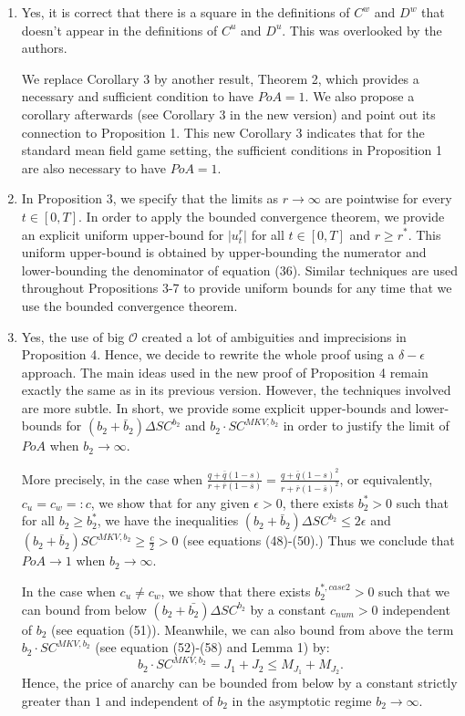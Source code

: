 \documentclass[11pt]{article}
\begin{document}
\begin{enumerate}
	\item Yes, it is correct that there is a square in the definitions of $C^w$ and $D^w$ that doesn't appear in the definitions of $C^u$ and $D^u$. This was overlooked by the authors.
	
	We replace Corollary 3 by another result, Theorem 2, which provides a necessary and sufficient condition to have $PoA = 1$. We also propose a corollary afterwards (see Corollary 3 in the new version) and point out its connection to Proposition 1. This new Corollary 3 indicates that for the standard mean field game setting, the sufficient conditions in Proposition 1 are also necessary to have $PoA=1$.
		
	
	\item In Proposition 3, we specify that the limits as $r \to \infty$ are pointwise for every $t \in [0,T]$. In order to apply the bounded convergence theorem, we provide an explicit uniform upper-bound for $\vert u_t^{r} \vert $ for all $t\in[0,T]$ and $r\geq r^*$. This uniform upper-bound is obtained by upper-bounding the numerator and lower-bounding the denominator of equation (36). Similar techniques are used throughout Propositions 3-7 to provide uniform bounds for any time that we use the bounded convergence theorem.
	
	\item Yes, the use of big $\mathcal{O}$ created a lot of ambiguities and imprecisions in Proposition 4. Hence, we decide to rewrite the whole proof using a $\delta-\epsilon$ approach. The main ideas used in the new proof of Proposition 4 remain exactly the same as in its previous version. However, the techniques involved are more subtle. In short, we provide some explicit upper-bounds and lower-bounds for $(b_2 + \bar{b}_2) \Delta SC^{b_2}$ and $b_2 \cdot SC^{MKV,b_2}$ in order to justify the limit of $PoA$ when $b_2 \to \infty$.
	
	More precisely, in the case when $\frac{q + \bar{q}(1-s)}{r + \bar{r}(1-\bar{s}) } = \frac{q + \bar{q}(1-s)^2}{r + \bar{r}(1-\bar{s})^2}$, or equivalently, $c_u = c_w=:c$, we show that for any given $\epsilon > 0$, there exists $b_2^*>0$ such that for all $b_2 \geq b_2^{*}$, we have the inequalities $(b_2 + \bar{b}_2) \Delta SC^{b_2} \leq 2\epsilon$ and 
	$(b_2 + \bar{b}_2) SC^{MKV,b_2} \geq \frac{c}{2} > 0$ (see equations (48)-(50).) Thus we conclude that $PoA \to 1$ when $b_2 \to \infty$.
		
	In the case when $c_u \neq c_w$, we show that there exists $b_2^{*,case2}>0$ such that we can bound from below $(b_2 + \bar{b_2}) \Delta SC^{b_2}$ by a constant $c_{num}>0$ independent of $b_2$ (see equation (51)). Meanwhile, we can also bound from above the term $b_2 \cdot SC^{MKV,b_2}$ (see equation (52)-(58) and Lemma 1) by: 
	$$ b_2 \cdot SC^{MKV,b_2} = J_1 + J_2 \leq M_{J_1} + M_{J_2}.$$
	Hence, the price of anarchy can be bounded from below by a constant strictly greater than $1$ and independent of $b_2$ in the asymptotic regime $b_2 \to \infty$.	
	 

\end{enumerate}
\end{document}
